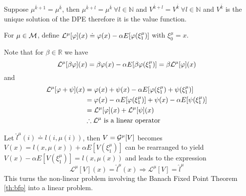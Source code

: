 \begin{theorem}
\label{th:dpeuniquesol}
Suppose $\mu^{\bar{k}+1}=\mu^{\bar{k}}$, then $\mu^{\bar{k}+l}=\mu^{\bar{k}} ~\forall l\in\mathbb{N}$ and $V^{\bar{k}+l}=V^{\bar{k}} ~\forall l\in\mathbb{N}$ and $V^{\bar{k}}$ is the unique solution of the DPE therefore it is the value function.
\end{theorem}

\begin{definition}
For $\mu\in\mathcal{M}$, define $\mathcal{L}^\mu[\varphi](x)\doteq \varphi(x)-\alpha E[\varphi(\xi_1^\mu)]$ with $\xi_0^\mu=x$.
\end{definition}

Note that for $\beta\in\mathbb{R}$ we have
$$\mathcal{L}^\mu[\beta\varphi](x) = \beta\varphi(x)-\alpha E[\beta\varphi(\xi_1^\mu)] = \beta\mathcal{L}^\mu[\varphi](x)$$
and
\begin{align*}
\mathcal{L}^\mu[\varphi+\psi](x) &= \varphi(x)+\psi(x) - \alpha E[\varphi(\xi_1^\mu)+\psi(\xi_1^\mu)] \\
&= \varphi(x)-\alpha E[\varphi(\xi_1^\mu)]+\psi(x)-\alpha E[\psi(\xi_1^\mu)] \\
&= \mathcal{L}^\mu[\varphi](x) + \mathcal{L}^\mu[\psi](x) \\
&\therefore \mathcal{L}^\mu \text{ is a linear operator}
\end{align*}

Let $\hat{l}^\mu(i)\doteq l(i,\mu(i))$, then $V=\mathcal{G}^\mu[V]$ becomes $V(x)=l(x,\mu(x))+\alpha E[V(\xi_1^\mu)]$ can be rearranged to yield $V(x)-\alpha E[V(\xi_1^\mu)] = l(x,\mu(x))$ and leads to the expression
$$\mathcal{L}^\mu[V](x) = \hat{l}^\mu(x) \Rightarrow \mathcal{L}^\mu[V] = \hat{l}^\mu$$
This turns the non-linear problem involving the Banach Fixed Point Theorem \ref{th:bfp} into a linear problem.


